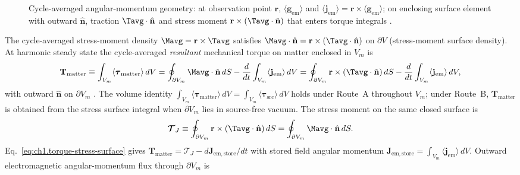 \begin{figure}[t]
\centering
\VolIPhysFigWide{\VolIPhysMomentumAngularGeometry}
\caption{Cycle-averaged angular-momentum geometry: at observation point $\mathbf{r}$, $\langle\mathbf{g}_{\mathrm{em}}\rangle$ and $\langle\mathbf{j}_{\mathrm{em}}\rangle=\mathbf{r}\times\langle\mathbf{g}_{\mathrm{em}}\rangle$; on enclosing surface element with outward $\hat{\mathbf{n}}$, traction $\Tavg\cdot\hat{\mathbf{n}}$ and stress moment $\mathbf{r}\times(\Tavg\cdot\hat{\mathbf{n}})$ that enters torque integrals \cite{maxwell1873,beth1936,stratton1941}.}
\label{fig:ch1.momentum-angular-geometry}
\end{figure}

The cycle-averaged stress-moment density $\Mavg=\mathbf{r}\times\Tavg$ satisfies
$\Mavg\cdot\hat{\mathbf{n}}=\mathbf{r}\times(\Tavg\cdot\hat{\mathbf{n}})$ on $\partial V$ (stress-moment surface density).
At harmonic steady state the cycle-averaged \emph{resultant} mechanical torque on matter enclosed in $V_m$ is
\begin{equation}
\label{eq:ch1.torque-stress-surface}
\mathbf{T}_{\mathrm{matter}}
\equiv
\int_{V_m}\langle\boldsymbol{\tau}_{\mathrm{matter}}\rangle\,dV
=\oint_{\partial V_m}\Mavg\cdot\hat{\mathbf{n}}\,dS
-\frac{d}{dt}\int_{V_m} \langle\mathbf{j}_{\mathrm{em}}\rangle\,dV
=\oint_{\partial V_m}\mathbf{r}\times(\Tavg\cdot\hat{\mathbf{n}})\,dS
-\frac{d}{dt}\int_{V_m} \langle\mathbf{j}_{\mathrm{em}}\rangle\,dV,
\end{equation}
with outward $\hat{\mathbf{n}}$ on $\partial V_m$ \cite{beth1936,stratton1941}. The volume identity $\int_{V_m}\langle\boldsymbol{\tau}_{\mathrm{matter}}\rangle\,dV=\int_{V_m}\langle\boldsymbol{\tau}_{\mathrm{src}}\rangle\,dV$ holds under Route~A throughout $V_m$; under Route~B, $\mathbf{T}_{\mathrm{matter}}$ is obtained from the stress surface integral when $\partial V_m$ lies in source-free vacuum. The stress moment on the same closed surface is
\begin{equation}
\label{eq:ch1.stress-moment-integral}
\boldsymbol{\mathcal{T}}_J
\equiv
\oint_{\partial V_m}\mathbf{r}\times(\Tavg\cdot\hat{\mathbf{n}})\,dS
=\oint_{\partial V_m}\Mavg\cdot\hat{\mathbf{n}}\,dS.
\end{equation}
Eq.~\eqref{eq:ch1.torque-stress-surface} gives $\mathbf{T}_{\mathrm{matter}}=\boldsymbol{\mathcal{T}}_J-d\mathbf{J}_{\mathrm{em,store}}/dt$ with stored field angular momentum $\mathbf{J}_{\mathrm{em,store}}=\int_{V_m}\langle\mathbf{j}_{\mathrm{em}}\rangle\,dV$. Outward electromagnetic angular-momentum flux through $\partial V_m$ is
